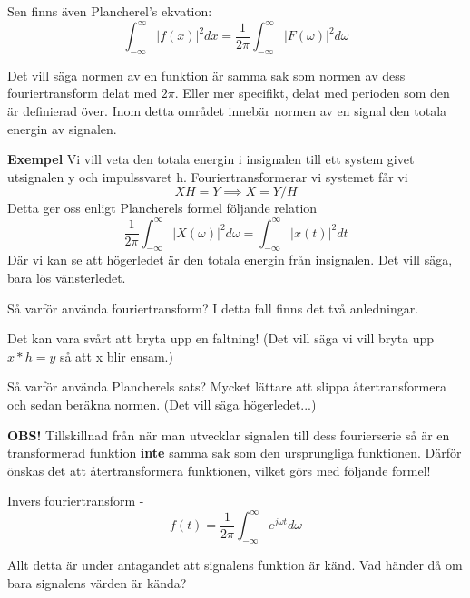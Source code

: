 \documentclass{article}
\begin{document}
Sen finns även Plancherel's ekvation: %
\[\int_{-\infty}^{\infty} |f(x)|^2 dx = \frac{1}{2 \pi}\int_{-\infty}^{\infty} |F(\omega)|^2 d\omega \] %

Det vill säga normen av en funktion är samma sak som normen av dess fouriertransform delat med $2 \pi$. Eller mer specifikt, delat med perioden som den är definierad över. Inom detta området innebär normen av en signal den totala energin av signalen. %

\textbf{Exempel}
Vi vill veta den totala energin i insignalen till ett system givet utsignalen y och impulssvaret h. Fouriertransformerar vi systemet får vi 
\[XH = Y \implies X = Y/H\]
Detta ger oss enligt Plancherels formel följande relation
\[ \frac{1}{2 \pi} \int_{-\infty}^{\infty} |X(\omega)|^2 d \omega = \int_{-\infty}^{\infty} |x(t)|^2 d t \]
Där vi kan se att högerledet är den totala energin från insignalen. 
Det vill säga, bara lös vänsterledet. 

Så varför använda fouriertransform? I detta fall finns det två anledningar. %

Det kan vara svårt att bryta upp en faltning! (Det vill säga vi vill bryta upp $x*h=y$ så att x blir ensam.)

Så varför använda Plancherels sats? Mycket lättare att slippa återtransformera och sedan beräkna normen. (Det vill säga högerledet...)

\textbf{OBS!} Tillskillnad från när man utvecklar signalen till dess fourierserie så är en transformerad funktion \textbf{inte} samma sak som den ursprungliga funktionen. Därför önskas det att återtransformera funktionen, vilket görs med följande formel!

Invers fouriertransform - 
\[f(t) = \frac{1}{2 \pi} \int_{-\infty}^{\infty}  e^{j \omega t} d\omega \]

Allt detta är under antagandet att signalens funktion är känd. Vad händer då om bara signalens värden är kända?

\end{document}
